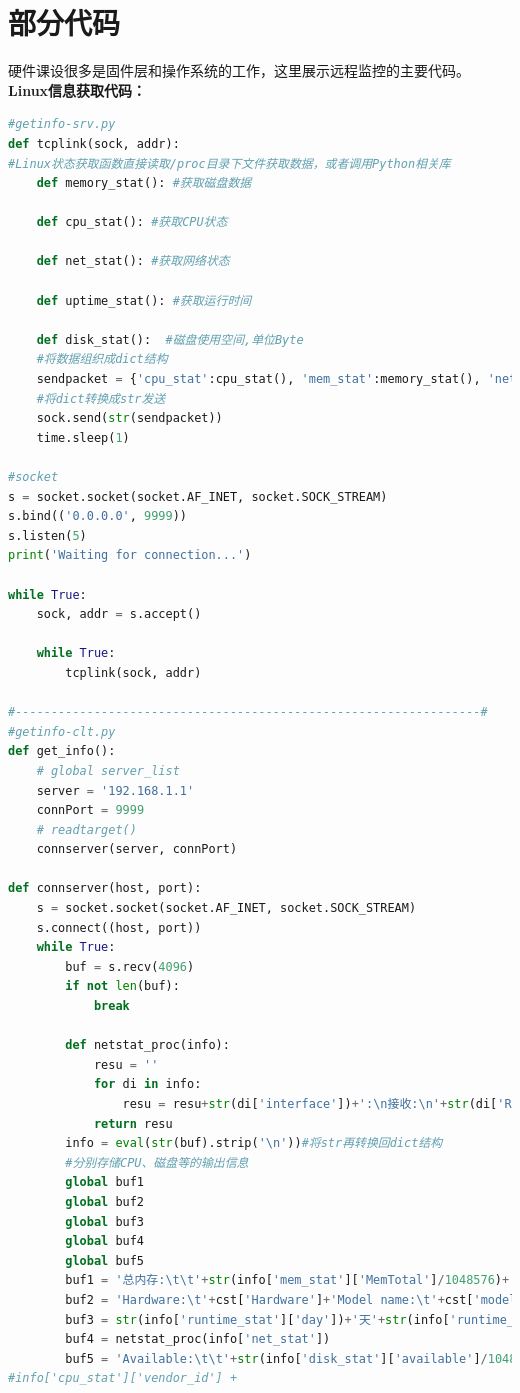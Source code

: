 \documentclass{itecreport-zh}
\begin{document}
\section{部分代码}
硬件课设很多是固件层和操作系统的工作，这里展示远程监控的主要代码。
\textbf{Linux信息获取代码：}
\begin{lstlisting}[language=Python]
#getinfo-srv.py
def tcplink(sock, addr):
#Linux状态获取函数直接读取/proc目录下文件获取数据，或者调用Python相关库
    def memory_stat(): #获取磁盘数据

    def cpu_stat(): #获取CPU状态

    def net_stat(): #获取网络状态

    def uptime_stat(): #获取运行时间

    def disk_stat():  #磁盘使用空间,单位Byte
    #将数据组织成dict结构
    sendpacket = {'cpu_stat':cpu_stat(), 'mem_stat':memory_stat(), 'net_stat':net_stat(), 'runtime_stat':uptime_stat(), 'disk_stat':disk_stat()}
    #将dict转换成str发送
    sock.send(str(sendpacket))
    time.sleep(1)

#socket
s = socket.socket(socket.AF_INET, socket.SOCK_STREAM)
s.bind(('0.0.0.0', 9999))
s.listen(5)
print('Waiting for connection...')

while True:
    sock, addr = s.accept()
    
    while True:
        tcplink(sock, addr)

#-----------------------------------------------------------------#
#getinfo-clt.py
def get_info():
    # global server_list
    server = '192.168.1.1'
    connPort = 9999
    # readtarget()
    connserver(server, connPort)

def connserver(host, port):
    s = socket.socket(socket.AF_INET, socket.SOCK_STREAM)
    s.connect((host, port))
    while True:
        buf = s.recv(4096)
        if not len(buf):
            break

        def netstat_proc(info):
            resu = ''
            for di in info:
                resu = resu+str(di['interface'])+':\n接收:\n'+str(di['ReceiveBytes']/1048576)+'MB\t\t'+str(di['ReceivePackets'])+'Packets\n发送:\n'+str(di['TransmitBytes']/1048576)+'MB\t\t'+str(di['TransmitPackets'])+'Packets\n\n'
            return resu
        info = eval(str(buf).strip('\n'))#将str再转换回dict结构
        #分别存储CPU、磁盘等的输出信息
        global buf1
        global buf2
        global buf3
        global buf4
        global buf5
        buf1 = '总内存:\t\t'+str(info['mem_stat']['MemTotal']/1048576)+'MB\n剩余内存:\t\t'+str(info['mem_stat']['MemFree']/1048576)+'MB'
        buf2 = 'Hardware:\t'+cst['Hardware']+'Model name:\t'+cst['model name']+'CPU implementer:\t'+cst['CPU implementer']+'CPU architecture:\t'+cst['CPU architecture']+'Features:\t'+cst['Features']
        buf3 = str(info['runtime_stat']['day'])+'天'+str(info['runtime_stat']['hour'])+'时'+str(info['runtime_stat']['minute'])+'分'+str(info['runtime_stat']['second'])+'秒'#).strip('\n')
        buf4 = netstat_proc(info['net_stat'])
        buf5 = 'Available:\t\t'+str(info['disk_stat']['available']/1048576)+'GB\nUsed:\t\t'+str(info['disk_stat']['used']/1048576)+'GB\nCapacity:\t\t'+str(info['disk_stat']['capacity']/1048576)+'GB'
#info['cpu_stat']['vendor_id'] + 


\end{lstlisting}
\end{document}
